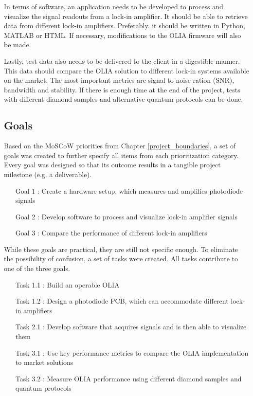 \documentclass{report}
\begin{document}
	In terms of software, an application needs to be developed to process and visualize the signal readouts from a lock-in amplifier. It should be able to retrieve data from different lock-in amplifiers. Preferably. it should be written in Python, MATLAB or HTML. If necessary, modifications to the OLIA firmware will also be made. 
	
	Lastly, test data also needs to be delivered to the client in a digestible manner. This data should compare the OLIA solution to different lock-in systems available on the market. The most important metrics are signal-to-noise ration (SNR), bandwidth and stability. If there is enough time at the end of the project, tests with different diamond samples and alternative quantum protocols can be done.
	
	\subsection{Goals} \label{chap:goals}
	Based on the MoSCoW priorities from Chapter \ref{project_boundaries}, a set of goals was created to further specify all items from each prioritization category. Every goal was designed so that its outcome results in a tangible project milestone (e.g. a deliverable).
	
	\begin{itemize}
		\item[Goal 1]: Create a hardware setup, which measures and amplifies photodiode signals
		\item[Goal 2]: Develop software to process and visualize lock-in amplifier signals
		\item[Goal 3]: Compare the performance of different lock-in amplifiers
	\end{itemize}
	
	While these goals are practical, they are still not specific enough. To eliminate the possibility of confusion, a set of tasks were created. All tasks contribute to one of the three goals.
	
	\begin{itemize}
		\item[Task 1.1]: Build an operable OLIA
		\item[Task 1.2]: Design a photodiode PCB, which can accommodate different lock-in amplifiers
		\item[Task 2.1]: Develop software that acquires signals and is then able to visualize them
		\item[Task 3.1]: Use key performance metrics to compare the OLIA implementation to market solutions
		\item[Task 3.2]: Measure OLIA performance using different diamond samples and quantum protocols
	\end{itemize}
	
\end{document}
